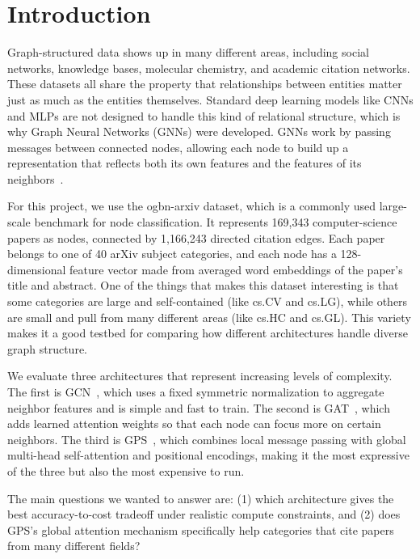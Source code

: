 \documentclass[conference]{IEEEtran}
\begin{document}
\section{Introduction}

Graph-structured data shows up in many different areas, including social networks, knowledge
bases, molecular chemistry, and academic citation networks. These datasets all share the
property that relationships between entities matter just as much as the entities themselves.
Standard deep learning models like CNNs and MLPs are not designed to handle this kind of
relational structure, which is why Graph Neural Networks (GNNs) were developed. GNNs work
by passing messages between connected nodes, allowing each node to build up a representation
that reflects both its own features and the features of its neighbors~\cite{kipf2017}.

For this project, we use the ogbn-arxiv dataset, which is a commonly used large-scale
benchmark for node classification. It represents 169,343 computer-science papers as nodes,
connected by 1,166,243 directed citation edges. Each paper belongs to one of 40 arXiv
subject categories, and each node has a 128-dimensional feature vector made from averaged
word embeddings of the paper's title and abstract. One of the things that makes this
dataset interesting is that some categories are large and self-contained (like cs.CV and
cs.LG), while others are small and pull from many different areas (like cs.HC and cs.GL).
This variety makes it a good testbed for comparing how different architectures handle
diverse graph structure.

We evaluate three architectures that represent increasing levels of complexity. The first
is GCN~\cite{kipf2017}, which uses a fixed symmetric normalization to aggregate neighbor
features and is simple and fast to train. The second is GAT~\cite{velickovic2018}, which
adds learned attention weights so that each node can focus more on certain neighbors. The
third is GPS~\cite{rampasek2022}, which combines local message passing with global
multi-head self-attention and positional encodings, making it the most expressive of the
three but also the most expensive to run.

The main questions we wanted to answer are: (1) which architecture gives the best
accuracy-to-cost tradeoff under realistic compute constraints, and (2) does GPS's global
attention mechanism specifically help categories that cite papers from many different
fields?
\end{document}
